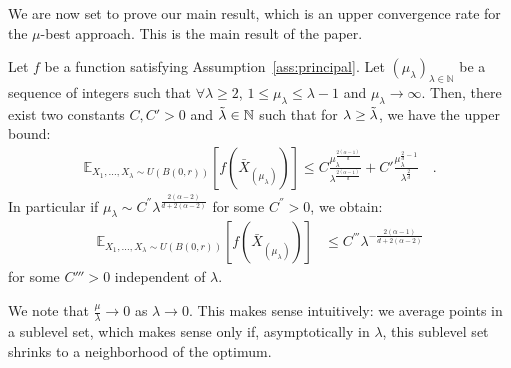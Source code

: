 We are now set to prove our main result, which is an upper convergence rate for the $\mu$-best approach. This is the main result of the paper.
\begin{thm}\label{thm:principal}
Let $f$ be a function satisfying Assumption~\ref{ass:principal}.  Let $(\mu_\lambda)_{\lambda\in\mathbb{N}}$ be a sequence of integers such that $\forall\lambda\geq 2$, $1\leq \mu_\lambda \leq \lambda -1$ and $\mu_\lambda\to\infty$. Then, there exist two constants $C,C'>0$ and $\Tilde{\lambda}\in \mathbb{N}$ such that  for $\lambda\geq\Tilde{\lambda}$, we have the upper bound: 
\begin{align*}
 \mathbb{E}_{X_{1},\dots,X_{\lambda}\sim U(B(0,r))}\left[f(\bar{X}_{(\mu_\lambda)})\right] \leq C\frac{\mu_\lambda^{\frac{2(\alpha-1)}{d}}}{\lambda^{\frac{2(\alpha-1)}{d}}}+C'\frac{\mu_\lambda^{\frac{2}{d}-1}}{\lambda^{\frac{2}{d}}}\quad.
\end{align*}
In particular if $\mu_{\lambda}\sim C^{''}\lambda^{\frac{2(\alpha-2)}{d+2(\alpha-2)}}$
for some $C^{''}>0$, we obtain:
\begin{align*}
\mathbb{E}_{X_{1},\dots,X_{\lambda}\sim U(B(0,r))}\left[f(\bar{X}_{(\mu_{\lambda})})\right] & \le C^{'''}\lambda^{-\frac{2(\alpha-1)}{d+2(\alpha-2)}}
\end{align*}
for some $C'''>0$ independent of $\lambda$.\end{thm}

{We note that $\frac{\mu}{\lambda}\to 0$ as $\lambda\to 0$. This makes sense intuitively: we average points in a sublevel set, which makes sense only if, asymptotically in $\lambda$, this sublevel set shrinks to a neighborhood of the optimum.}

